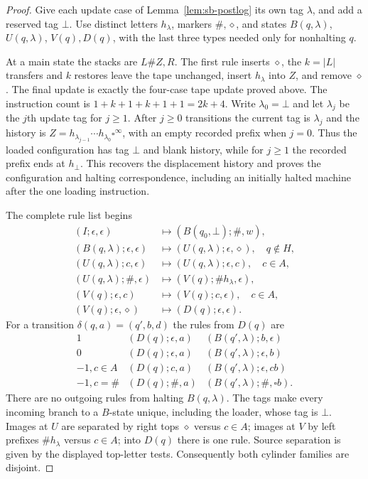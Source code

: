 \begin{proof}
Give each update case of Lemma~\ref{lem:sb-postlog} its own tag $\lambda$, and add a reserved tag $\bot$.  Use distinct letters $h_\lambda$, markers $\#,\diamond$, and states $B(q,\lambda)$, $U(q,\lambda)$, $V(q),D(q)$, with the last three types needed only for nonhalting $q$.

At a main state the stacks are $L\#Z,R$.  The first rule inserts $\diamond$, the $k=|L|$ transfers and $k$ restores leave the tape unchanged, insert $h_\lambda$ into $Z$, and remove $\diamond$.  The final update is exactly the four-case tape update proved above.  The instruction count is $1+k+1+k+1+1=2k+4$.  Write $\lambda_0=\bot$ and let $\lambda_j$ be the $j$th update tag for $j\ge1$.  After $j\ge0$ transitions the current tag is $\lambda_j$ and the history is $Z=h_{\lambda_{j-1}}\cdots h_{\lambda_0}\square^\infty$, with an empty recorded prefix when $j=0$.  Thus the loaded configuration has tag $\bot$ and blank history, while for $j\ge1$ the recorded prefix ends at $h_\bot$.  This recovers the displacement history and proves the configuration and halting correspondence, including an initially halted machine after the one loading instruction.

The complete rule list begins
\begin{align*}
 (I;\epsilon,\epsilon)&\mapsto(B(q_0,\bot);\#,w),\\
 (B(q,\lambda);\epsilon,\epsilon)&\mapsto(U(q,\lambda);\epsilon,\diamond),\quad q\notin H,\\
 (U(q,\lambda);c,\epsilon)&\mapsto(U(q,\lambda);\epsilon,c),\quad c\in A,\\
 (U(q,\lambda);\#,\epsilon)&\mapsto(V(q);\#h_\lambda,\epsilon),\\
 (V(q);\epsilon,c)&\mapsto(V(q);c,\epsilon),\quad c\in A,\\
 (V(q);\epsilon,\diamond)&\mapsto(D(q);\epsilon,\epsilon).
\end{align*}
For a transition $\delta(q,a)=(q',b,d)$ the rules from $D(q)$ are
\[
\begin{array}{c|c|c}
1&(D(q);\epsilon,a)&(B(q',\lambda);b,\epsilon)\\
0&(D(q);\epsilon,a)&(B(q',\lambda);\epsilon,b)\\
-1, c\in A&(D(q);c,a)&(B(q',\lambda);\epsilon,cb)\\
-1, c=\#&(D(q);\#,a)&(B(q',\lambda);\#,\square b).
\end{array}
\]
There are no outgoing rules from halting $B(q,\lambda)$.
The tags make every incoming branch to a $B$-state unique, including the loader, whose tag is $\bot$.  Images at $U$ are separated by right tops $\diamond$ versus $c\in A$; images at $V$ by left prefixes $\#h_\lambda$ versus $c\in A$; into $D(q)$ there is one rule.  Source separation is given by the displayed top-letter tests.  Consequently both cylinder families are disjoint.
\end{proof}


